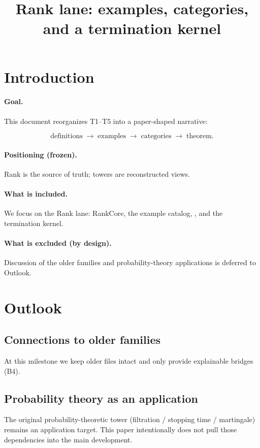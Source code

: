 \documentclass[11pt]{article}
\title{Rank lane: examples, categories, and a termination kernel}
\author{}
\date{}
\begin{document}
\maketitle
\tableofcontents

\section{Introduction}
\label{sec:intro}

\paragraph{Goal.}
This document reorganizes T1--T5 into a paper-shaped narrative:

\[
\text{definitions} \;\to\; \text{examples} \;\to\; \text{categories} \;\to\; \text{theorem}.
\]

\paragraph{Positioning (frozen).}
Rank is the source of truth; towers are reconstructed views.

\paragraph{What is included.}
We focus on the Rank lane: RankCore, the example catalog, ,
and the termination kernel.

\paragraph{What is excluded (by design).}
Discussion of the older  families and probability-theory applications is deferred to Outlook.






\section{Outlook}
\label{sec:outlook}

\subsection{Connections to older  families}
At this milestone we keep older files intact and only provide explainable bridges (B4).

\subsection{Probability theory as an application}
The original probability-theoretic tower (filtration / stopping time / martingale) remains an application target.
This paper intentionally does not pull those dependencies into the main development.
\end{document}
